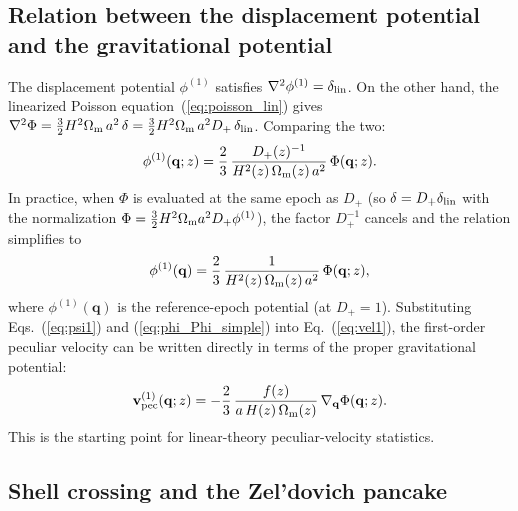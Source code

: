 \documentclass[12pt]{article}
\newcommand{\bq}{\mathbf{q}}
\newcommand{\bv}{\mathbf{v}}
\newcommand{\Dp}{D_+}
\newcommand{\Omm}{\Omega_{\rm m}}
\begin{document}
\subsection{Relation between the displacement potential and the
  gravitational potential}
\label{sec:phi_Phi}

The displacement potential $\phi^{(1)}$ satisfies
$\nabla^2\phi^{(1)} = \delta_{\rm lin}$.  On the other hand, the
linearized Poisson equation~(\ref{eq:poisson_lin}) gives
$\nabla^2\Phi = \tfrac{3}{2}H^2\Omm\,a^2\,\delta = \tfrac{3}{2}H^2\Omm\,a^2\Dp\,\delta_{\rm lin}$.
Comparing the two:
%
\begin{equation}
  \phi^{(1)}(\bq; z)
    = \frac{2}{3}\,\frac{\Dp(z)^{-1}}{H^2(z)\,\Omm(z)\,a^2}\,\Phi(\bq; z).
  \label{eq:phi_Phi}
\end{equation}
%
In practice, when $\Phi$ is evaluated at the same epoch as $\Dp$ (so
$\delta = \Dp\delta_{\rm lin}$ with the normalization
$\Phi = \frac{3}{2}H^2\Omm a^2\Dp\phi^{(1)}$), the factor $\Dp^{-1}$
cancels and the relation simplifies to
%
\begin{equation}
  \phi^{(1)}(\bq)
    = \frac{2}{3}\,\frac{1}{H^2(z)\,\Omm(z)\,a^2}\,\Phi(\bq; z),
  \label{eq:phi_Phi_simple}
\end{equation}
%
where $\phi^{(1)}(\bq)$ is the reference-epoch potential (at $\Dp=1$).
Substituting Eqs.~(\ref{eq:psi1}) and (\ref{eq:phi_Phi_simple}) into
Eq.~(\ref{eq:vel1}), the first-order peculiar velocity can be written
directly in terms of the proper gravitational potential:
%
\begin{equation}
  \bv_{\rm pec}^{(1)}(\bq; z)
    = -\frac{2}{3}\,\frac{f(z)}{a\,H(z)\,\Omm(z)}\,
      \nabla_\bq\Phi(\bq; z).
  \label{eq:vpec_Phi}
\end{equation}
%
This is the starting point for linear-theory peculiar-velocity
statistics.

\subsection{Shell crossing and the Zel'dovich pancake}
\label{sec:pancake}
\end{document}
